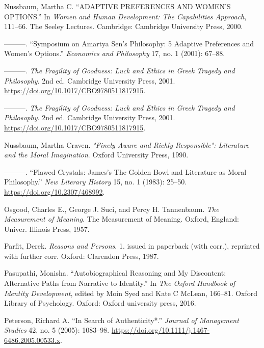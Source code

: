 \documentclass[phdthesis,12pt,final]{wuthesis}
\newlength{\cslhangindent}
\newenvironment{CSLReferences}[2] %
{\begin{list}{}{%
	\setlength{\itemindent}{0pt}
	\setlength{\leftmargin}{0pt}
	\setlength{\parsep}{0pt}
	\ifodd #1
	\setlength{\leftmargin}{\cslhangindent}
	\setlength{\itemindent}{-1\cslhangindent}
	\fi
	\setlength{\itemsep}{#2\baselineskip}}}
{\end{list}}
\theoremstyle{definition}
\theoremstyle{definition}
\theoremstyle{definition}
\theoremstyle{definition}
\theoremstyle{remark}
\begin{document}
\begin{CSLReferences}{1}{0}
Nussbaum, Martha C. {``{ADAPTIVE PREFERENCES AND WOMEN}'{S OPTIONS}.''} In \emph{Women and Human Development: {The} Capabilities Approach}, 111--66. The Seeley Lectures. Cambridge: Cambridge University Press, 2000.

---------. {``Symposium on {Amartya Sen}'s Philosophy: 5 Adaptive Preferences and Women's Options.''} \emph{Economics and Philosophy} 17, no. 1 (2001): 67--88.

---------. \emph{The {Fragility} of {Goodness}: {Luck} and {Ethics} in {Greek Tragedy} and {Philosophy}}. 2nd ed. Cambridge University Press, 2001. \url{https://doi.org/10.1017/CBO9780511817915}.

---------. \emph{The {Fragility} of {Goodness}: {Luck} and {Ethics} in {Greek Tragedy} and {Philosophy}}. 2nd ed. Cambridge University Press, 2001. \url{https://doi.org/10.1017/CBO9780511817915}.

Nussbaum, Martha Craven. \emph{"{Finely Aware} and {Richly Responsible}": {Literature} and the {Moral Imagination}}. Oxford University Press, 1990.

---------. {``Flawed {Crystals}: {James}'s {The Golden Bowl} and {Literature} as {Moral Philosophy}.''} \emph{New Literary History} 15, no. 1 (1983): 25--50. \url{https://doi.org/10.2307/468992}.

Osgood, Charles E., George J. Suci, and Percy H. Tannenbaum. \emph{The Measurement of Meaning}. The Measurement of Meaning. Oxford, England: Univer. Illinois Press, 1957.

Parfit, Derek. \emph{Reasons and Persons}. 1. issued in paperback (with corr.), reprinted with further corr. Oxford: Clarendon Press, 1987.

Pasupathi, Monisha. {``Autobiographical {Reasoning} and {My} {Discontent}: {Alternative Paths} from {Narrative} to {Identity}.''} In \emph{The {Oxford} Handbook of Identity Development}, edited by Moin Syed and Kate C McLean, 166--81. Oxford Library of Psychology. Oxford: Oxford university press, 2016.

Peterson, Richard A. {``In {Search} of {Authenticity}*.''} \emph{Journal of Management Studies} 42, no. 5 (2005): 1083--98. \url{https://doi.org/10.1111/j.1467-6486.2005.00533.x}.


\end{CSLReferences}
\end{document}
